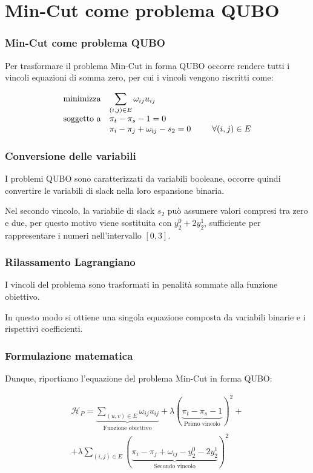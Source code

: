 \documentclass[10pt]{beamer}
\begin{document}
\section[Da CSP a QUBO]{Min-Cut come problema QUBO}
\begin{frame}
  \frametitle{Min-Cut come problema QUBO}

  Per trasformare il problema Min-Cut in forma QUBO occorre rendere tutti i vincoli equazioni di somma zero, per cui i vincoli vengono riscritti come:

  \begin{equation*}
    \begin{array}{ll@{}ll}
    \text{minimizza}    & \displaystyle\sum_{(i, j) \in E} \omega_{ij}u_{ij}&\\
    \text{soggetto a}   & \displaystyle \pi_t - \pi_s - 1 = 0 &\\
                        & \displaystyle \pi_i - \pi_j  + \omega_{ij} - s_2 = 0\;\;\;\;\;\;\;\;\; & \forall (i,j) \in E\\
    \end{array}
\end{equation*}

\end{frame}
\begin{frame}
  \frametitle{Conversione delle variabili}

  I problemi QUBO sono caratterizzati da variabili booleane, occorre quindi convertire le variabili di slack nella loro espansione binaria.

  Nel secondo vincolo, la variabile di slack $s_2$ può assumere valori compresi tra zero e due, per questo motivo viene sostituita con $y_2^0 + 2y_2^1$, sufficiente per rappresentare i numeri nell'intervallo $[0, 3]$.

\end{frame}
\begin{frame}
  \frametitle{Rilassamento Lagrangiano}

  I vincoli del problema sono trasformati in penalità sommate alla funzione obiettivo.

  In questo modo si ottiene una singola equazione composta da variabili binarie e i rispettivi coefficienti.

\end{frame}
\begin{frame}
  \frametitle{Formulazione matematica}

  Dunque, riportiamo l'equazione del problema Min-Cut in forma QUBO:

  \begin{center}
    \begin{multline*}
      \mathcal{H}_P = \underbrace{\sum_{(u, v) \in E} \omega_{ij}u_{ij}}_{\text{Funzione obiettivo}} + \lambda(\underbrace{\pi_t - \pi_s - 1}_{\text{Primo vincolo}})^2 + \\ + \lambda\sum_{(i, j) \in E}(\underbrace{\pi_i - \pi_j + \omega_{ij} - y_2^0 - 2y_2^1}_{\text{Secondo vincolo}})^2
    \end{multline*}    
\end{center}

\end{frame}
\end{document}
